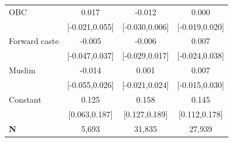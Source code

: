\begin{tabular}{l*{3}{c}}
\addlinespace
\hspace*{1em}OBC    &                 0.017&                -0.012&                 0.000\\
                    &        [-0.021,0.055]&        [-0.030,0.006]&        [-0.019,0.020]\\
\addlinespace
\hspace*{1em}Forward caste&                -0.005&                -0.006&                 0.007\\
                    &        [-0.047,0.037]&        [-0.029,0.017]&        [-0.024,0.038]\\
\addlinespace
\hspace*{1em}Muslim &                -0.014&                 0.001&                 0.007\\
                    &        [-0.055,0.026]&        [-0.021,0.024]&        [-0.015,0.030]\\
\addlinespace
\hspace*{1em}Constant&                 0.125&                 0.158&                 0.145\\
                    &         [0.063,0.187]&         [0.127,0.189]&         [0.112,0.178]\\
\midrule
\textbf{N}          &                 5,693&                31,835&                27,939\\
\bottomrule
\end{tabular}

